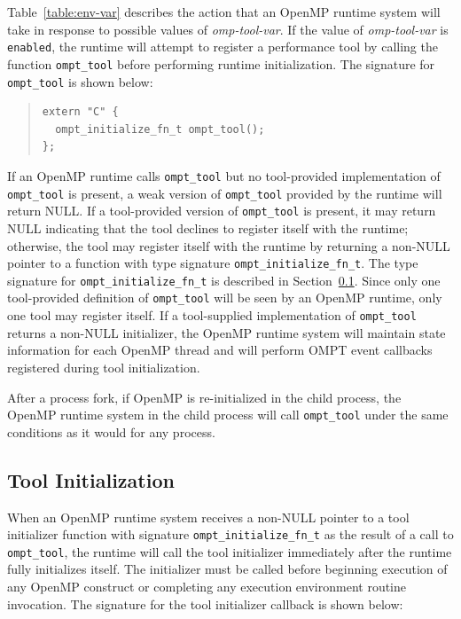 \documentclass{article}
\begin{document}

\sloppy
Table~\ref{table:env-var} describes the action that an OpenMP runtime system will take in response to possible values of {\em omp-tool-var}.
If the value of {\em omp-tool-var}  is  \verb|enabled|, the runtime will attempt to register  a performance tool by calling the function \verb|ompt_tool| before performing  runtime initialization. The signature for  \verb|ompt_tool|  is shown below:
\begin{quote}
\begin{verbatim}
extern "C" {
  ompt_initialize_fn_t ompt_tool();
};
\end{verbatim}
\end{quote}
If an OpenMP runtime calls \verb|ompt_tool| but no tool-provided implementation of \verb|ompt_tool| is present,
a weak version of \verb|ompt_tool| provided by the runtime  will return NULL. If a tool-provided version of \verb|ompt_tool| is present, it may return NULL indicating that the tool declines to register itself with the runtime; otherwise, the tool  may register itself with the runtime by returning a non-NULL pointer to a function with type signature \verb|ompt_initialize_fn_t|. The type signature for \verb|ompt_initialize_fn_t| is described in Section~\ref{sec:init}. 
Since only one tool-provided definition of \verb|ompt_tool| will be seen by an OpenMP runtime, only one tool may register itself. 
If a tool-supplied implementation of \verb|ompt_tool| returns a non-NULL initializer, the OpenMP runtime system will maintain state information for each OpenMP thread and will perform OMPT event callbacks registered during tool initialization. 

After a process fork, if OpenMP is re-initialized in the child process,
the OpenMP runtime system in the child process will call  \verb|ompt_tool| under the same conditions as it would for any process. 

\subsection{Tool Initialization}
\label{sec:init}

When an OpenMP runtime system receives a non-NULL pointer to a tool initializer function with signature \verb|ompt_initialize_fn_t| as the result of a call to  \verb|ompt_tool|, the runtime will call the tool initializer immediately after the runtime fully initializes itself. The initializer must be called before beginning execution of any OpenMP construct or completing any execution environment  routine invocation.  The signature for the tool initializer callback is shown below:
\end{document}
